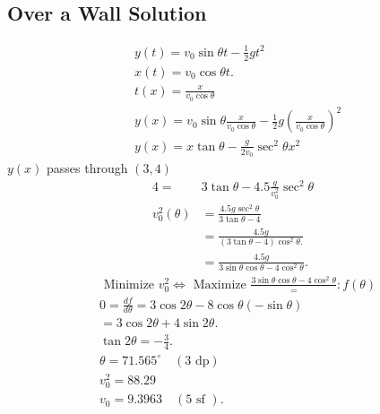 \documentclass{article}
\begin{document}
\subsection{Over a Wall Solution}
$$
\begin{aligned}
& y(t)=v_0 \sin \theta t-\frac{1}{2} g t^2 \\
& x(t)=v_0 \cos \theta t . \\
& t(x)=\frac{x}{v_0 \cos \theta} \\
& y(x)=v_0 \sin \theta \frac{x}{v_0 \cos \theta}-\frac{1}{2} g\left(\frac{x}{v_0 \cos \theta}\right)^2 \\
& y(x)=x \tan \theta-\frac{g}{2 v_0} \sec ^2 \theta x^2
\end{aligned}
$$
$y(x)$ passes through $(3,4)$
\begin{align}
4= & 3 \tan \theta-4.5 \frac{g}{v_0^2} \sec ^2 \theta \\
v_0^2(\theta) & =\frac{4.5 g \sec ^2 \theta}{3 \tan \theta-4} \\
& =\frac{4.5 g}{(3 \tan \theta-4) \cos ^2 \theta .} \\
& =\frac{4.5 g}{3 \sin \theta \cos \theta-4 \cos ^2 \theta} .
\end{align}
\begin{align}
& \text { Minimize } v_0^2 \Longleftrightarrow \text { Maximize } \frac{3 \sin \theta \cos \theta-4 \cos ^2 \theta} =: f(\theta) \\
& 0=\frac{d f}{d \theta}=3 \cos 2 \theta-8 \cos \theta(-\sin \theta) \\
& =3 \cos 2 \theta+4 \sin 2 \theta \text {. } \\
& \tan 2 \theta=-\frac{3}{4} \text {. } \\
& \theta=71.565^{\circ} \quad(3 \text { dp}) \\
& v_0^2=88.29 \\
& v_0=9.3963 \quad(5 \text { sf }) \text {. } 
\end{align}
\clearpage 
\end{document}
